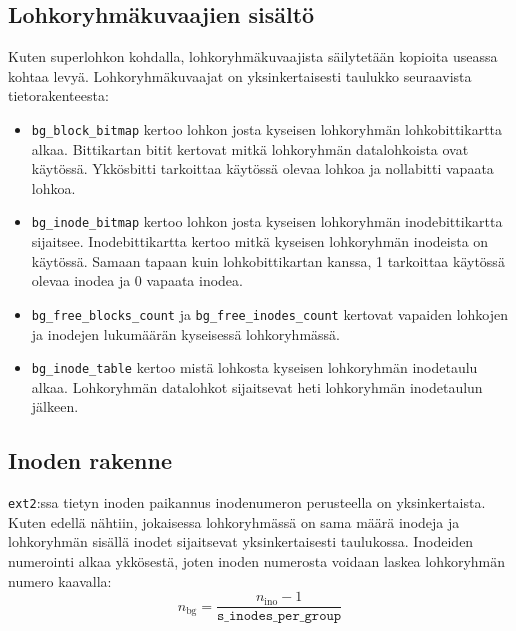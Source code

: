 \subsection{Lohkoryhmäkuvaajien sisältö}
Kuten superlohkon kohdalla, lohkoryhmäkuvaajista säilytetään kopioita useassa kohtaa levyä.
Lohkoryhmäkuvaajat on yksinkertaisesti taulukko seuraavista tietorakenteesta:
\begin{itemize}
    \item \texttt{bg\_block\_bitmap} kertoo lohkon josta kyseisen lohkoryhmän lohkobittikartta alkaa.
          Bittikartan bitit kertovat mitkä lohkoryhmän datalohkoista ovat käytössä.
          Ykkösbitti tarkoittaa käytössä olevaa lohkoa ja nollabitti vapaata lohkoa.
    \item \texttt{bg\_inode\_bitmap} kertoo lohkon josta kyseisen lohkoryhmän inodebittikartta sijaitsee.
          Inodebittikartta kertoo mitkä kyseisen lohkoryhmän inodeista on käytössä.
          Samaan tapaan kuin lohkobittikartan kanssa, 1 tarkoittaa käytössä olevaa inodea ja 0 vapaata inodea.
    \item \texttt{bg\_free\_blocks\_count} ja \texttt{bg\_free\_inodes\_count} kertovat vapaiden lohkojen ja inodejen lukumäärän kyseisessä lohkoryhmässä.
    \item \texttt{bg\_inode\_table} kertoo mistä lohkosta kyseisen lohkoryhmän inodetaulu alkaa. Lohkoryhmän datalohkot sijaitsevat heti lohkoryhmän inodetaulun jälkeen.
\end{itemize}

\subsection{Inoden rakenne}

\texttt{ext2}:ssa tietyn inoden paikannus inodenumeron perusteella on yksinkertaista.
Kuten edellä nähtiin, jokaisessa lohkoryhmässä on sama määrä inodeja ja lohkoryhmän sisällä inodet sijaitsevat yksinkertaisesti taulukossa.
Inodeiden numerointi alkaa ykkösestä, joten inoden numerosta voidaan laskea lohkoryhmän numero kaavalla:
$$ n_\text{bg} = \frac{n_\text{ino} - 1}{\texttt{s\_inodes\_per\_group}} $$

